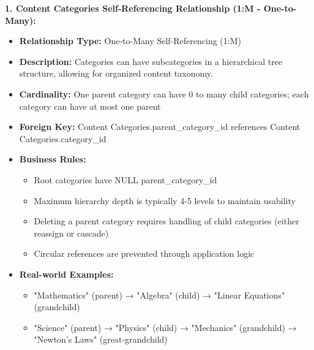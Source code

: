 \documentclass[12pt,a4paper,oneside]{book}
\begin{document}
\textbf{1. Content Categories Self-Referencing Relationship (1:M - One-to-Many):}
\begin{itemize}
    \item \textbf{Relationship Type:} One-to-Many Self-Referencing (1:M)
    \item \textbf{Description:} Categories can have subcategories in a hierarchical tree structure, allowing for organized content taxonomy.
    \item \textbf{Cardinality:} One parent category can have 0 to many child categories; each category can have at most one parent
    \item \textbf{Foreign Key:} Content Categories.parent\_category\_id references Content Categories.category\_id
    \item \textbf{Business Rules:}
        \begin{itemize}
            \item Root categories have NULL parent\_category\_id
            \item Maximum hierarchy depth is typically 4-5 levels to maintain usability
            \item Deleting a parent category requires handling of child categories (either reassign or cascade)
            \item Circular references are prevented through application logic
        \end{itemize}
    \item \textbf{Real-world Examples:}
        \begin{itemize}
            \item "Mathematics" (parent) → "Algebra" (child) → "Linear Equations" (grandchild)
            \item "Science" (parent) → "Physics" (child) → "Mechanics" (grandchild) → "Newton's Laws" (great-grandchild)
        \end{itemize}
\end{itemize}
\end{document}
